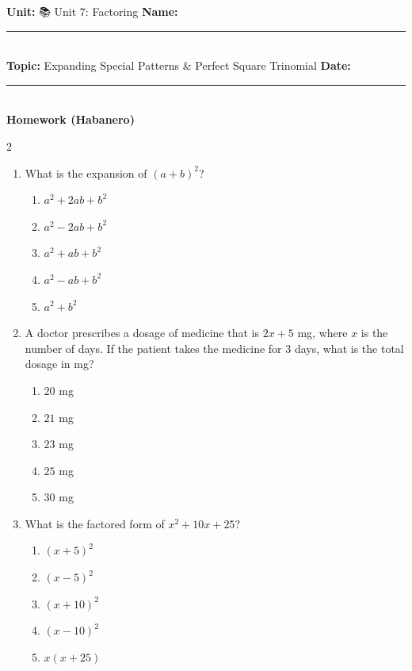 \documentclass[10pt]{article}
\begin{document}
\enlargethispage{2.5cm}

\begin{tcolorbox}[colback=mainblue!5, colframe=mainblue, sharp corners, boxrule=0.5pt]
    \small \textbf{Unit:} 📚 Unit 7: Factoring \hfill \textbf{Name:} \rule{3cm}{0.4pt} \\
    \small \textbf{Topic:} Expanding Special Patterns & Perfect Square Trinomial \hfill \textbf{Date:} \rule{2cm}{0.4pt} \\
    \centering \textbf{\large Homework (Habanero)}
\end{tcolorbox}

\vspace{0.2cm}

\begin{multicols}{2}
\begin{enumerate}[label=\textbf{Q\arabic*.}, leftmargin=*, itemsep=6pt, parsep=0pt]

  \item \small What is the expansion of $(a + b)^2$?
  \begin{enumerate}[label=(\Alph*), leftmargin=0.6cm, nosep, itemsep=2pt]
    \item $a^2 + 2ab + b^2$
    \item $a^2 - 2ab + b^2$
    \item $a^2 + ab + b^2$
    \item $a^2 - ab + b^2$
    \item $a^2 + b^2$
  \end{enumerate}

  \item \small A doctor prescribes a dosage of medicine that is $2x + 5$ mg, where $x$ is the number of days. If the patient takes the medicine for $3$ days, what is the total dosage in mg?
  \begin{enumerate}[label=(\Alph*), leftmargin=0.6cm, nosep, itemsep=2pt]
    \item $20$ mg
    \item $21$ mg
    \item $23$ mg
    \item $25$ mg
    \item $30$ mg
  \end{enumerate}

  \item \small What is the factored form of $x^2 + 10x + 25$?
  \begin{enumerate}[label=(\Alph*), leftmargin=0.6cm, nosep, itemsep=2pt]
    \item $(x + 5)^2$
    \item $(x - 5)^2$
    \item $(x + 10)^2$
    \item $(x - 10)^2$
    \item $x(x + 25)$
  \end{enumerate}


\end{enumerate}
\end{multicols}
\end{document}
